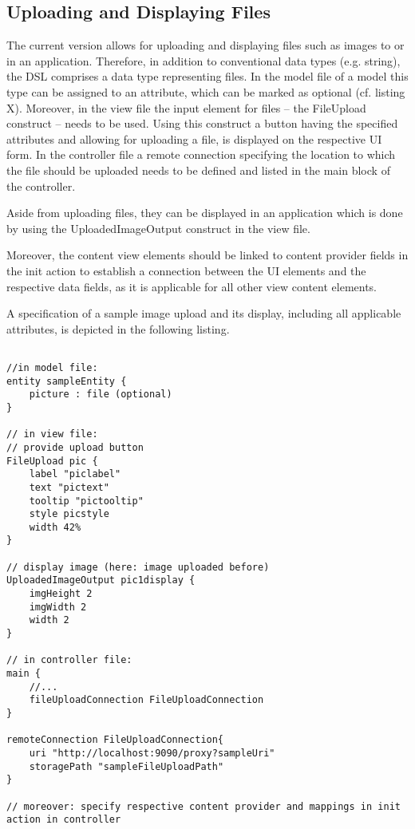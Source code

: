 
\subsection{Uploading and Displaying Files}
\label{subsec: UploadSaveDisplayWebServices}
The current \MD version allows for uploading and displaying files such as images to or in an application. Therefore, in addition to conventional data types (e.g. string), the DSL comprises a data type representing files. In the model file of a \MD model this type can be assigned to an attribute, which can be marked as optional (cf. listing X). Moreover, in the view file the input element for files -- the FileUpload construct -- needs to be used. Using this construct a button having the specified attributes and allowing for uploading a file, is displayed on the respective UI form. In the controller file a remote connection specifying the location to which the file should be uploaded needs to be defined and listed in the main block of the controller. 

Aside from uploading files, they can be displayed in an application which is done by using the UploadedImageOutput construct in the view file.

Moreover, the content view elements should be linked to content provider fields in the init action to establish a connection between the UI elements and the respective data fields, as it is applicable for all other view content elements.

A specification of a sample image upload and its display, including all applicable attributes, is depicted in the following listing.

\begin{lstlisting}[language=MD2, label=lst:uploadfiles, caption=Upload and Display of Files]

//in model file:
entity sampleEntity {
	picture : file (optional)
}

// in view file:
// provide upload button
FileUpload pic {
	label "piclabel"
	text "pictext"
	tooltip "pictooltip"		
	style picstyle
	width 42%
}		

// display image (here: image uploaded before)
UploadedImageOutput pic1display {
	imgHeight 2
	imgWidth 2
	width 2
}

// in controller file:
main {
	//...
	fileUploadConnection FileUploadConnection
}

remoteConnection FileUploadConnection{
	uri "http://localhost:9090/proxy?sampleUri"
	storagePath "sampleFileUploadPath"
}

// moreover: specify respective content provider and mappings in init action in controller

\end{lstlisting}




